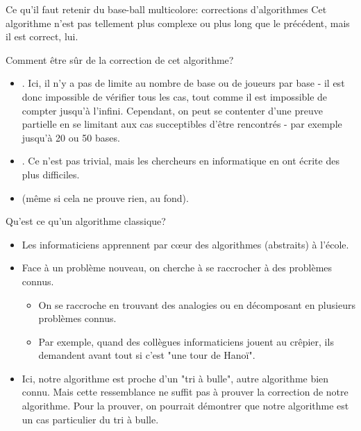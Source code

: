 \begin{frame}{Ce qu'il faut retenir du base-ball multicolore: corrections d'algorithmes}
  Cet algorithme n'est pas tellement plus complexe ou plus long que le
  précédent, mais il est correct, lui.

  \begin{block}{Comment être sûr de la \alert{correction} de cet algorithme?}
    \begin{itemize}
    \item {}. Ici, il n'y a pas de limite au nombre de base ou de joueurs par base - il est donc impossible de vérifier tous les cas, tout comme il est impossible de compter jusqu'à l'infini. Cependant, on peut se contenter d'une preuve partielle en se limitant aux cas succeptibles d'être rencontrés - par exemple jusqu'à 20 ou 50 bases.
    \item {}. Ce n'est pas trivial, mais les chercheurs en informatique en ont écrite des plus difficiles.
    \item {} (même si cela ne prouve rien, au fond).
    \end{itemize}
  \end{block}

  \begin{block}{Qu'est ce qu'un \alert{algorithme classique}?}
    \begin{itemize}
    \item Les informaticiens apprennent par cœur des algorithmes (abstraits) à l'école.
    \item Face à un problème nouveau, on cherche à se raccrocher à des problèmes connus.
      \begin{itemize}
      \item On se raccroche en trouvant des analogies ou en décomposant en plusieurs problèmes connus.
      \item Par exemple, quand des collègues informaticiens jouent au crêpier, ils demandent avant tout si c'est "une tour de Hanoï".
      \end{itemize}
    \item Ici, notre algorithme est proche d'un "tri à bulle", autre algorithme bien connu. Mais cette ressemblance ne suffit pas à prouver la correction de notre algorithme. Pour la prouver, on pourrait démontrer que notre algorithme est un cas particulier du tri à bulle.
    \end{itemize}
  \end{block}


\end{frame}

